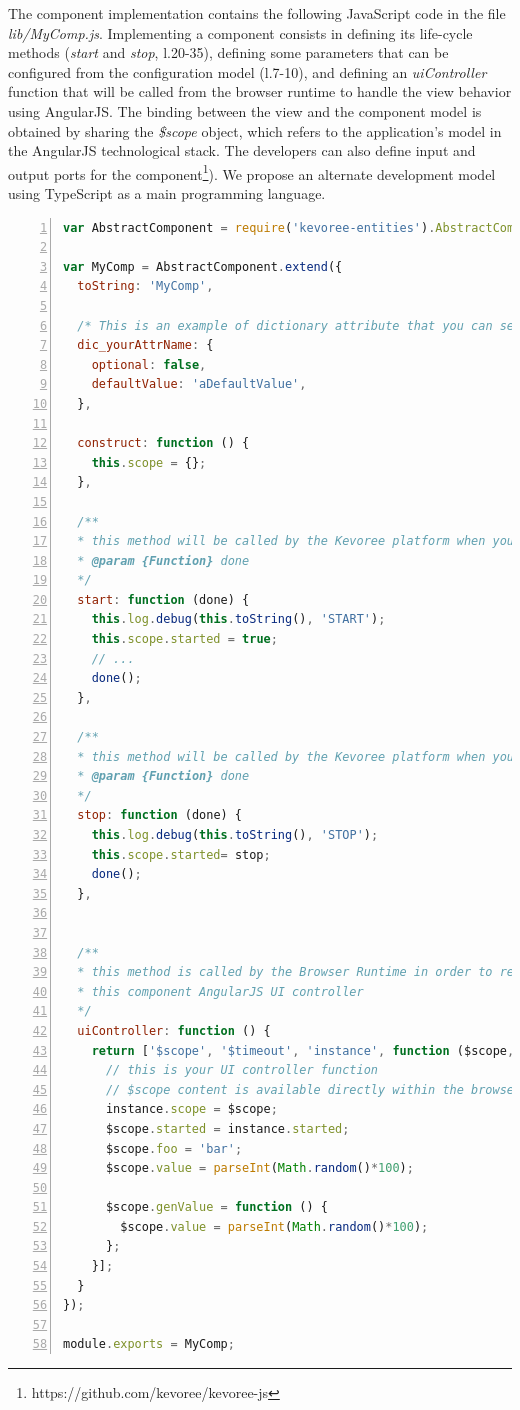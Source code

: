 The component implementation contains the following JavaScript code in the file \emph{lib/MyComp.js}. Implementing a component consists in defining its life-cycle methods (\emph{start} and \emph{stop}, l.20-35), defining some parameters that can be configured from the configuration model (l.7-10), and defining an \emph{uiController} function that will be called from the browser runtime to handle the view behavior using AngularJS. The binding between the view and the component model is obtained by sharing the \emph{\$scope} object, which refers to the application's model in the AngularJS technological stack. The developers can also define input and output ports for the component\footnote{https://github.com/kevoree/kevoree-js}). We propose an alternate development model using TypeScript as a main programming language.



\begin{lstlisting}[language=JavaScript,numbers=left,firstnumber=1,basicstyle=\scriptsize,deletekeywords={port},frame=none,caption={Excerpt of the component implementation}]
var AbstractComponent = require('kevoree-entities').AbstractComponent;

var MyComp = AbstractComponent.extend({
  toString: 'MyComp',

  /* This is an example of dictionary attribute that you can set for your entity */
  dic_yourAttrName: {
    optional: false,
    defaultValue: 'aDefaultValue',
  },

  construct: function () {
    this.scope = {};
  },

  /**
  * this method will be called by the Kevoree platform when your component has to start
  * @param {Function} done
  */
  start: function (done) {
    this.log.debug(this.toString(), 'START');
    this.scope.started = true;
    // ...
    done();
  },

  /**
  * this method will be called by the Kevoree platform when your component has to stop
  * @param {Function} done
  */
  stop: function (done) {
    this.log.debug(this.toString(), 'STOP');
    this.scope.started= stop;
    done();
  },


  /**
  * this method is called by the Browser Runtime in order to retrieve
  * this component AngularJS UI controller
  */
  uiController: function () {
    return ['$scope', '$timeout', 'instance', function ($scope, $timeout, instance) {
      // this is your UI controller function
      // $scope content is available directly within the browser/kevoree-comp-foocomp.html file
      instance.scope = $scope;
      $scope.started = instance.started;
      $scope.foo = 'bar';
      $scope.value = parseInt(Math.random()*100);
      
      $scope.genValue = function () {
        $scope.value = parseInt(Math.random()*100);
      };
    }];
  }
});

module.exports = MyComp;
\end{lstlisting}


